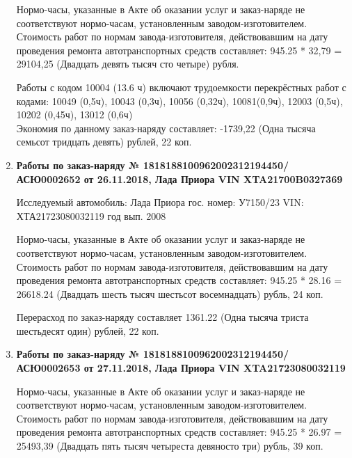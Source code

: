 \begin{enumerate}
Нормо-часы, указанные в Акте об оказании услуг и заказ-наряде не соответствуют нормо-часам,  установленным заводом-изготовителем.\\
Стоимость работ по нормам завода-изготовителя, действовавшим на дату проведения ремонта автотранспортных средств составляет: 945.25 * 32,79 = 29104,25 (Двадцать девять тысяч сто четыре) рубля.

Работы с кодом 10004 (13.6 ч)  включают трудоемкости перекрёстных  работ с кодами:  10049 (0,5ч), 10043 (0,3ч), 10056 (0,32ч),  10081(0,9ч), 12003 (0,5ч), 10202 (0,45ч), 13012 (0,6ч)\\
Экономия по данному заказ-наряду  составляет: -1739,22 (Одна тысяча семьсот тридцать девять) рублей, 22 коп.
\vspace{3mm}


\item \par\textbf{{Работы по заказ-наряду   № 1818188100962002312194450/\-АСЮ0002652 от 26.11.2018, Лада Приора  VIN   XTA21700B0327369
}}

Исследуемый автомобиль:  Лада Приора гос. номер: У7150/23 VIN: ХТА21723080032119 год вып. 2008



Нормо-часы, указанные в Акте об оказании услуг и заказ-наряде не соответствуют нормо-часам,  установленным заводом-изготовителем.\\
Стоимость работ по нормам завода-изготовителя, действовавшим на дату проведения ремонта автотранспортных средств составляет: 945.25 * 28.16  = 26618.24 (Двадцать шесть тысяч шестьсот восемнадцать) рубль, 24 коп.

Перерасход по заказ-наряду составляет 1361.22 (Одна тысяча триста шестьдесят один) рублей, 22 коп.  
\vspace{3mm}




\item \par\textbf{{Работы по заказ-наряду  № 1818188100962002312194450/\-АСЮ0002653 от 27.11.2018, Лада Приора  VIN  XTA21723080032119
}}


Нормо-часы, указанные в Акте об оказании услуг и заказ-наряде не соответствуют нормо-часам,  установленным заводом-изготовителем.\\
Стоимость работ по нормам завода-изготовителя, действовавшим на дату проведения ремонта автотранспортных средств составляет: 945.25 * 26.97  = 25493,39 (Двадцать пять тысяч четыреста девяносто три) рубль, 39 коп.


\end{enumerate}
